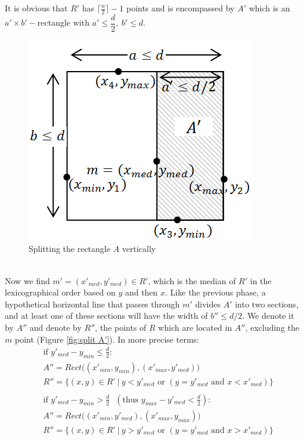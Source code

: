\documentclass{cccg12}
\begin{document}
It is obvious that $R'$ has ${ \lceil\frac{n}{2}\rceil-1 }$ points and is encompassed by $A'$ which is an ${ a' \times b'- }$rectangle with ${ a' \leq \dfrac{d}{2} ,\ b'\leq d }$.
\begin{figure} [h]
  \centering
  \includegraphics[scale=.5]{Figs/fig4.png}
  \caption{Splitting the rectangle $A$ vertically}
  \label{fig:split A}
\end{figure}\\
Now we find ${ m'=( x'_{med}, y'_{med})\in R' }$, which is the median of $R'$ in the lexicographical order based on $y$ and then $x$. Like the previous phase, a hypothetical horizontal line that passes through $m'$ divides $A'$ into two sections, and at least one of these sections will have the width of ${ b'' \leq d/2 }$. We denote it by $A''$ and denote by $R''$, the points of $R$ which are located in $A''$, excluding the $m$ point (Figure \ref{fig:split A'}). In more precise terms:
{\small\begin{align}
&\mbox{if \ } y'_{med}-y_{min} \leq \frac{d}{2}: \nonumber\\
&A''=Rect\big( (x'_{min},y_{min} ),(x'_{max},y'_{med} )  \big) \nonumber\\
&R''=\big\{(x,y)\in R'\ \big|\ y<y'_{med} \mbox{ or } (y=y'_{med} \mbox{ and } x<x'_{med} )  \big\} \nonumber\\
\nonumber\\
&\mbox{if \ } y'_{med}-y_{min}>\frac{d}{2}\ \ \ (\mbox{thus \ } y_{max}-y'_{med}<\frac{d}{2}): \nonumber\\
&A''=Rect\big( (x'_{min},y'_{med} ),( x'_{max},y_{max} )  \big) \nonumber\\
&R''=\big\{(x,y)\in R'\ \big|\ y>y'_{med} \mbox{ or } (y=y'_{med} \mbox{ and } x>x'_{med} ) \big\} \nonumber
\end{align}}
\end{document}
